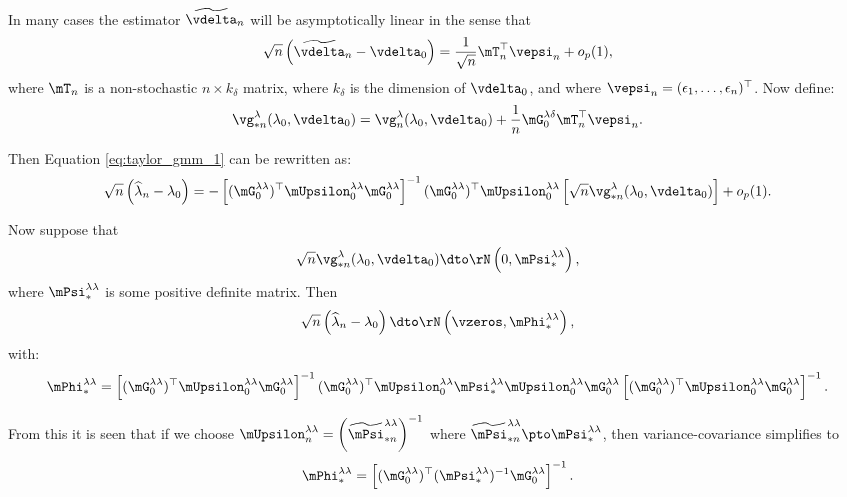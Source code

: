 In many cases the estimator $\widetilde{\vdelta}_n$ will be asymptotically linear in the sense that
\begin{equation*}
\sqrt{n}\left(\widetilde{\vdelta}_n - \vdelta_0\right)=\frac{1}{\sqrt{n}}\mT_n^\top\vepsi_n + o_p(1),
\end{equation*}
%
where $\mT_n$ is a non-stochastic $n\times k_{\delta}$ matrix, where $k_{\delta}$ is the dimension of $\vdelta_0$, and where $\vepsi_n = (\epsilon_1,\ldots,\epsilon_n)^\top$. Now define:
\begin{equation*}
\vg_{*n}^{\lambda}(\lambda_0, \vdelta_0) = \vg_n^{\lambda}(\lambda_0, \vdelta_0) + \frac{1}{n}\mG^{\lambda\delta}_0\mT_n^\top\vepsi_n.
\end{equation*}

Then Equation \eqref{eq:taylor_gmm_1} can be rewritten as:
\begin{equation}\label{eq:taylor_gmm_2}
\sqrt{n}\left(\widehat{\lambda}_n - \lambda_0\right) = - \left[(\mG^{\lambda\lambda}_0)^\top\mUpsilon^{\lambda\lambda}_0\mG^{\lambda\lambda}_0\right]^{-1}(\mG^{\lambda\lambda}_0)^\top\mUpsilon^{\lambda\lambda}_0\left[\sqrt{n}\vg_{*n}^{\lambda}(\lambda_0, \vdelta_0) \right] + o_p(1).
\end{equation}

Now suppose that 
\begin{equation*}
\sqrt{n}\vg_{*n}^{\lambda}(\lambda_0, \vdelta_0) \dto \rN\left(0, \mPsi^{\lambda\lambda}_{*}\right), 
\end{equation*}
%
where $\mPsi^{\lambda\lambda}_{*}$ is some positive definite matrix. Then
\begin{equation*}
\sqrt{n}\left(\widehat{\lambda}_n - \lambda_0\right)\dto \rN\left(\vzeros, \mPhi_{*}^{\lambda\lambda}\right),
\end{equation*}
%
with:
\begin{equation*}
\mPhi_{*}^{\lambda\lambda} = \left[(\mG^{\lambda\lambda}_0)^\top\mUpsilon^{\lambda\lambda}_0\mG^{\lambda\lambda}_0\right]^{-1}(\mG^{\lambda\lambda}_0)^\top\mUpsilon^{\lambda\lambda}_0\mPsi_{*}^{\lambda\lambda}\mUpsilon^{\lambda\lambda}_0\mG^{\lambda\lambda}_0\left[(\mG^{\lambda\lambda}_0)^\top\mUpsilon^{\lambda\lambda}_0\mG^{\lambda\lambda}_0\right]^{-1}.
\end{equation*}

From this it is seen that if we choose $\mUpsilon_n^{\lambda\lambda} = \left(\widetilde{\mPsi}_{*n}^{\lambda\lambda}\right)^{-1}$ where $\widetilde{\mPsi}_{*n}^{\lambda\lambda}\pto \mPsi_{*}^{\lambda\lambda}$, then variance-covariance simplifies to
\begin{equation*}
\mPhi_{*}^{\lambda\lambda} = \left[(\mG^{\lambda\lambda}_0)^\top(\mPsi^{\lambda\lambda}_{*})^{-1}\mG^{\lambda\lambda}_0\right]^{-1}.
\end{equation*}

